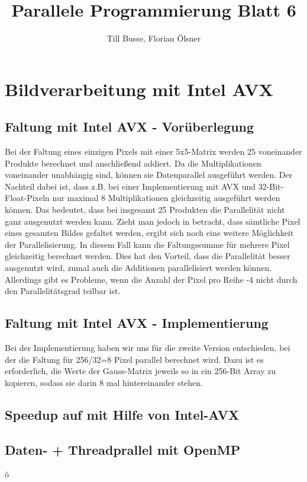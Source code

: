 \documentclass[12pt,a4paper]{article}
\author{Till Busse, Florian Ölsner}
\title{Parallele Programmierung Blatt 6}
\begin{document}
\maketitle
\pagebreak
\section{Bildverarbeitung mit Intel AVX}
\subsection{Faltung mit Intel AVX - Vorüberlegung}
Bei der Faltung eines einzigen Pixels mit einer 5x5-Matrix werden 25 voneinander Produkte berechnet und anschließend addiert. Da die Multiplikationen voneinander unabhängig sind, können sie Datenparallel ausgeführt werden. Der Nachteil dabei ist, dass z.B. bei einer Implementierung mit AVX und 32-Bit-Float-Pixeln nur maximal 8 Multiplikationen gleichzeitig ausgeführt werden können. Das bedeutet, dass bei insgesamt 25 Produkten die Parallelität nicht ganz ausgenutzt werden kann. Zieht man jedoch in betracht, dass sämtliche Pixel eines gesamten Bildes gefaltet werden, ergibt sich noch eine weitere Möglichkeit der Parallelisierung. In diesem Fall kann die Faltungssumme für mehrere Pixel gleichzeitig berechnet werden. Dies hat den Vorteil, dass die Parallelität besser ausgenutzt wird, zumal auch die Additionen parallelisiert werden können. Allerdings gibt es Probleme, wenn die Anzahl der Pixel pro Reihe -4 nicht durch den Parallelitätsgrad teilbar ist.
\subsection{Faltung mit Intel AVX - Implementierung}
Bei der Implementierung haben wir uns für die zweite Version entschieden, bei der die Faltung für 256/32=8 Pixel parallel berechnet wird. Dazu ist es erforderlich, die Werte der Gauss-Matrix jeweils so in ein 256-Bit Array zu kopieren, sodass sie darin 8 mal hintereinander stehen.

\subsection{Speedup auf mit Hilfe von Intel-AVX}

\subsection{Daten- + Threadprallel mit OpenMP}

ö
\end{document}
